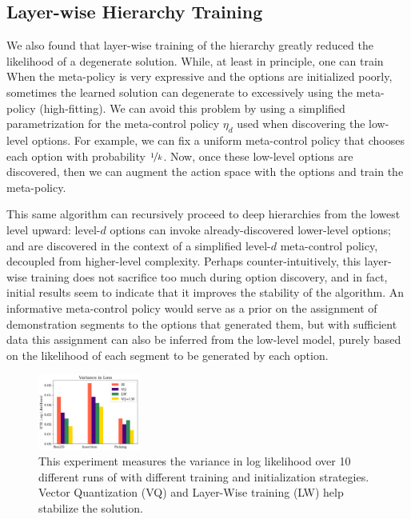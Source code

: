 \subsection*{Layer-wise Hierarchy Training}
We also found that layer-wise training of the hierarchy greatly reduced the likelihood of a degenerate solution.
While, at least in principle, one can train 
When the meta-policy is very expressive and the options are initialized poorly, sometimes the learned solution can degenerate to excessively using the meta-policy (high-fitting). 
We can avoid this problem by using a simplified parametrization for the meta-control policy $\eta_d$ used when discovering the low-level options. For example, we can fix a uniform meta-control policy that chooses each option with probability $\nicefrac 1 {k}$. Now, once these low-level options are discovered, then we can augment the action space with the options and train the meta-policy.

This same algorithm can recursively proceed to deep hierarchies from the lowest level upward: level-$d$ options can invoke already-discovered lower-level options; and are discovered in the context of a simplified level-$d$ meta-control policy, decoupled from higher-level complexity.
Perhaps counter-intuitively, this layer-wise training does not sacrifice too much during option discovery, and in fact, initial results seem to indicate that it improves the stability of the algorithm.
An informative meta-control policy would serve as a prior on the assignment of demonstration segments to the options that generated them, but with sufficient data this assignment can also be inferred from the low-level model, purely based on the likelihood of each segment to be generated by each option.

\begin{figure} [ht!]
\centering
    \includegraphics[width=0.3\textwidth]{ddco-experiments/exp8-1.png}
    \caption{This experiment measures the variance in log likelihood over 10 different runs of \alg with different training and initialization strategies. Vector Quantization (VQ) and Layer-Wise training (LW) help stabilize the solution. \label{fig:exp81}}
\end{figure}


